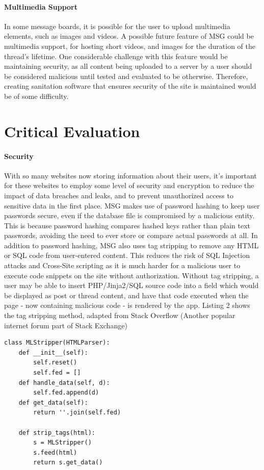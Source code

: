 \documentclass[10pt, a4paper]{article}
\begin{document}
	\paragraph{Multimedia Support}
	In some message boards, it is possible for the user to upload multimedia elements, such as images and videos. A possible future feature of MSG could be multimedia support, for hosting short videos, and images for the duration of the thread's lifetime. One considerable challenge with this feature would be maintaining security, as all content being uploaded to a server by a user should be considered malicious until tested and evaluated to be otherwise. Therefore, creating sanitation software that ensures security of the site is maintained would be of some difficulty.
	\section{Critical Evaluation}
	\paragraph{Security}
	With so many websites now storing information about their users, it's important for these websites to employ some level of security and encryption to reduce the impact of data breaches and leaks, and to prevent unauthorized access to sensitive data in the first place. MSG makes use of password hashing to keep user passwords secure, even if the database file is compromised by a malicious entity. This is because password hashing compares hashed keys rather than plain text passwords, avoiding the need to ever store or compare actual passwords at all.\newline
	In addition to password hashing, MSG also uses tag stripping to remove any HTML or SQL code from user-entered content. This reduces the risk of SQL Injection attacks and Cross-Site scripting as it is much harder for a malicious user to execute code snippets on the site without authorization. Without tag stripping, a user may be able to insert PHP/Jinja2/SQL source code into a field which would be displayed as post or thread content, and have that code executed when the page - now containing malicious code - is rendered by the app.
	Listing 2 shows the tag stripping method, adapted from Stack Overflow (Another popular internet forum part of Stack Exchange)\cite{StripTags}
	\begin{lstlisting}[caption = Python HTML Strip Tags]
	class MLStripper(HTMLParser):
    def __init__(self):
        self.reset()
        self.fed = []
    def handle_data(self, d):
        self.fed.append(d)
    def get_data(self):
        return ''.join(self.fed)

    def strip_tags(html):
        s = MLStripper()
        s.feed(html)
        return s.get_data()
	\end{lstlisting}
	
\end{document}

